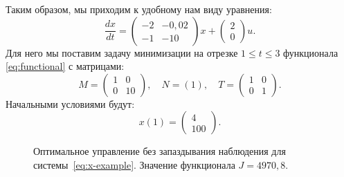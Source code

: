 Таким образом, мы приходим к удобному нам виду уравнения:
\begin{equation}\label{eq:x-example}
        \frac{dx}{dt}
        =
        \begin{pmatrix}
-2 & -0,\!02 \\
-1 & -10
        \end{pmatrix}
        x
        +
        \begin{pmatrix}
2 \\
0
        \end{pmatrix}
        u.
\end{equation}
Для него мы поставим задачу минимизации на отрезке $1 \leqslant t \leqslant 3$ функционала \eqref{eq:functional} с матрицами:
\begin{equation}\label{eq:ex-mat}
        M = \begin{pmatrix}
1 & 0 \\
0 & 10
        \end{pmatrix},
        \quad
        N = (1),
        \quad
        T = \begin{pmatrix}
1 & 0 \\
0 & 1
        \end{pmatrix}.
\end{equation}
Начальными условиями будут:
\begin{equation}\label{eq:ex-start}
        x(1) = \begin{pmatrix}
4 \\
100
        \end{pmatrix}.
\end{equation}
\begin{figure}[bh]
        \noindent{}
        \caption{Оптимальное управление без запаздывания наблюдения для системы~\eqref{eq:x-example}. Значение функционала $J = 4970,\!8$.}
        \label{img:simple-control}
\end{figure}
